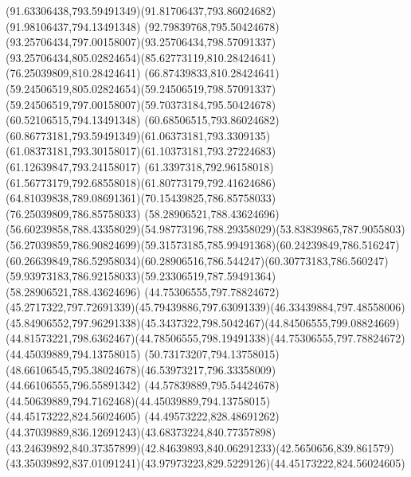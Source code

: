 {{	\curveto(91.63306438,793.59491349)(91.81706437,793.86024682)(91.98106437,794.13491348)
	\curveto(92.79839768,795.50424678)(93.25706434,797.00158007)(93.25706434,798.57091337)
	\curveto(93.25706434,805.02824654)(85.62773119,810.28424641)(76.25039809,810.28424641)
	\curveto(66.87439833,810.28424641)(59.24506519,805.02824654)(59.24506519,798.57091337)
	\curveto(59.24506519,797.00158007)(59.70373184,795.50424678)(60.52106515,794.13491348)
	\curveto(60.68506515,793.86024682)(60.86773181,793.59491349)(61.06373181,793.3309135)
	\curveto(61.08373181,793.30158017)(61.10373181,793.27224683)(61.12639847,793.24158017)
	\curveto(61.3397318,792.96158018)(61.56773179,792.68558018)(61.80773179,792.41624686)
	\curveto(64.81039838,789.08691361)(70.15439825,786.85758033)(76.25039809,786.85758033)
	\moveto(58.28906521,788.43624696)
	\curveto(56.60239858,788.43358029)(54.98773196,788.29358029)(53.83839865,787.9055803)
	\curveto(56.27039859,786.90824699)(59.31573185,785.99491368)(60.24239849,786.516247)
	\curveto(60.26639849,786.52958034)(60.28906516,786.544247)(60.30773183,786.560247)
	\curveto(59.93973183,786.92158033)(59.23306519,787.59491364)(58.28906521,788.43624696)
	\moveto(44.75306555,797.78824672)
	\curveto(45.2717322,797.72691339)(45.79439886,797.63091339)(46.33439884,797.48558006)
	\curveto(45.84906552,797.96291338)(45.3437322,798.5042467)(44.84506555,799.08824669)
	\curveto(44.81573221,798.6362467)(44.78506555,798.19491338)(44.75306555,797.78824672)
	\moveto(44.45039889,794.13758015)
	\lineto(50.73173207,794.13758015)
	\curveto(48.66106545,795.38024678)(46.53973217,796.33358009)(44.66106555,796.55891342)
	\curveto(44.57839889,795.54424678)(44.50639889,794.7162468)(44.45039889,794.13758015)
	\moveto(44.45173222,824.56024605)
	\curveto(44.49573222,828.48691262)(44.37039889,836.12691243)(43.68373224,840.77357898)
	\curveto(43.24639892,840.37357899)(42.84639893,840.06291233)(42.5650656,839.861579)
	\curveto(43.35039892,837.01091241)(43.97973223,829.5229126)(44.45173222,824.56024605)
}
}

